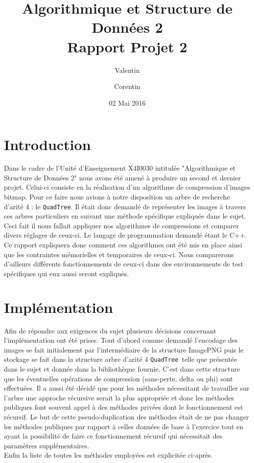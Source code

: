 \documentclass{article}
\title{Algorithmique et Structure de Données 2\\
Rapport Projet 2}
\author{Valentin \bsc{Hénique} \and Corentin \bsc{Chédotal}}
\date{02 Mai 2016}
\newcommand{\info}{\texttt}
\newcommand{\qt}{\info{QuadTree}}
\begin{document}
\maketitle

\section{Introduction}

Dans le cadre de l'Unité d'Enseignement X4I0030 intitulée "Algorithmique et Structure de Données 2" nous avons été amené à produire un second et dernier projet. Celui-ci consiste en la réalisation d'un algorithme de compression d'images bitmap. Pour ce faire nous avions à notre disposition un arbre de recherche d'arité 4 : le \qt. Il était donc demandé de représenter les images à travers ces arbres particuliers en suivant une méthode spécifique expliquée dans le sujet. Ceci fait il nous fallait appliquer nos algorithmes de compressions et comparer divers réglages de ceux-ci.
Le langage de programmation demandé étant le C++.\\
Ce rapport expliquera donc comment ces algorithmes ont été mis en place ainsi que les contraintes mémorielles et temporaires de ceux-ci. Nous comparerons d'ailleurs différents fonctionnements de ceux-ci dans des environnements de test spécifiques qui eux aussi seront expliqués.

\section{Implémentation}

Afin de répondre aux exigences du sujet plusieurs décisions concernant l'implémentation ont été prises. Tout d'abord comme demandé l'encodage des images se fait initialement par l'intermédiaire de la structure ImagePNG puis le stockage se fait dans la structure arbre d'arité 4 \qt\ telle que présentée dans le sujet et donnée dans la bibliothèque fournie. C'est dans cette structure que les éventuelles opérations de compression (sans-perte, delta ou phi) sont effectuées. Il a aussi été décidé que pour les méthodes nécessitant de travailler sur l'arbre une approche récursive serait la plus appropriée et donc les méthodes publiques font souvent appel à des méthodes privées dont le fonctionnement est récursif. Le but de cette pseudo-duplication des méthodes était de ne pas changer les méthodes publiques par rapport à celles données de base à l'exercice tout en ayant la possibilité de faire ce fonctionnement récursif qui nécessitait des paramètres supplémentaires.\\
Enfin la liste de toutes les méthodes employées est explicitée ci-après.
\end{document}
